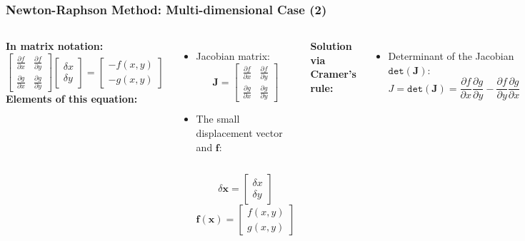 \begin{frame}[fragile]
  \frametitle{Newton-Raphson Method: Multi-dimensional Case (2)}
  \begin{columns}
  \textbf{In matrix notation:}
  \[
      \begin{bmatrix}
          \frac{\partial f}{\partial x} & \frac{\partial f}{\partial y} \\
          \frac{\partial g}{\partial x} & \frac{\partial g}{\partial y}
      \end{bmatrix}
      \begin{bmatrix}
          \delta x \\
          \delta y
      \end{bmatrix}
      =
      \begin{bmatrix}
          -f(x, y) \\
          -g(x, y)
      \end{bmatrix}
  \]
  \textbf{Elements of this equation:}
  \begin{itemize}
      \item Jacobian matrix:
      \[
          \mathbf{J} = 
          \begin{bmatrix}
              \frac{\partial f}{\partial x} & \frac{\partial f}{\partial y} \\
              \frac{\partial g}{\partial x} & \frac{\partial g}{\partial y}
          \end{bmatrix}
      \]
      \item The small displacement vector and $\mathbf{f}$:
      \begin{columns}
        \[
            \delta \mathbf{x} = 
            \begin{bmatrix}
              \delta x \\
              \delta y
            \end{bmatrix}
        \]
        \[
          \mathbf{f}(\mathbf{x})=
          \begin{bmatrix}
            f(x,y) \\
            g(x,y)
          \end{bmatrix}
          \]
      \end{columns}
  \end{itemize}
  \textbf{Solution via Cramer’s rule:}
  \begin{itemize}
      \item Determinant of the Jacobian $\texttt{det}(\mathbf{J})$:
      \[
          J = \texttt{det}(\mathbf{J}) = \frac{\partial f}{\partial x} \frac{\partial g}{\partial y} - \frac{\partial f}{\partial y} \frac{\partial g}{\partial x}
      \]


\end{itemize}
\end{columns}
\end{frame}
